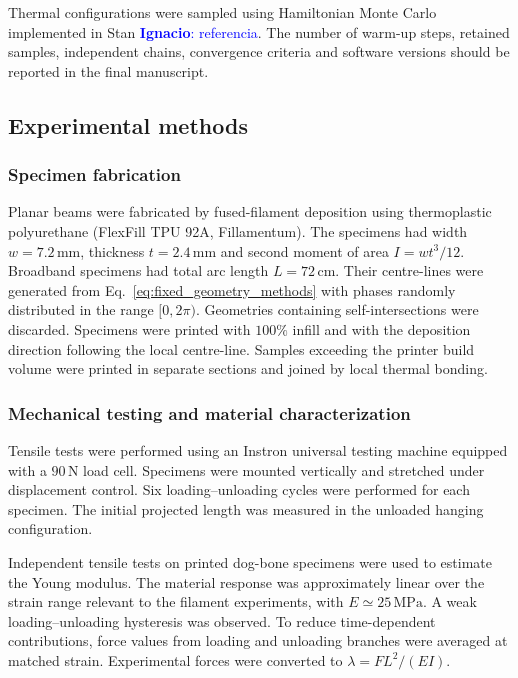 \documentclass[pdflatex, twocolumn, sn-nature]{sn-jnl}
\newcommand{\ign}[1]{\textcolor{blue}{\textbf{Ignacio}: #1}}
\begin{document}
Thermal configurations were sampled using Hamiltonian Monte Carlo implemented in Stan \ign{referencia}. The number of warm-up steps, retained samples, independent chains, convergence criteria and software versions should be reported in the final manuscript.

\subsection*{Experimental methods}
\label{sec:experimental_methods}

\subsubsection*{Specimen fabrication}

Planar beams were fabricated by fused-filament deposition using thermoplastic polyurethane (FlexFill TPU 92A, Fillamentum). The specimens had width $w=7.2\,\mathrm{mm}$, thickness $t=2.4\,\mathrm{mm}$ and second moment of area $I=wt^3/12$.
Broadband specimens had total arc length $L=72\,\mathrm{cm}$. Their centre-lines were generated from Eq.~\eqref{eq:fixed_geometry_methods} with phases randomly distributed in the range $[0,2\pi)$. Geometries containing self-intersections were discarded. 
Specimens were printed with $100\%$ infill and with the deposition direction following the local centre-line. Samples exceeding the printer build volume were printed in separate sections and joined by local thermal bonding.

\subsubsection*{Mechanical testing and material characterization}

Tensile tests were performed using an Instron universal testing machine equipped with a $90\,\mathrm{N}$ load cell. Specimens were mounted vertically and stretched under displacement control. Six loading--unloading cycles were performed for each specimen. The initial projected length was measured in the unloaded hanging configuration.

Independent tensile tests on printed dog-bone specimens were used to estimate the Young modulus. The material response was approximately linear over the strain range relevant to the filament experiments, with $E\simeq25\,\mathrm{MPa}$. A weak loading--unloading hysteresis was observed. To reduce time-dependent contributions, force values from loading and unloading branches were averaged at matched strain. Experimental forces were converted to $\lambda=FL^2/(EI)$.
\end{document}

